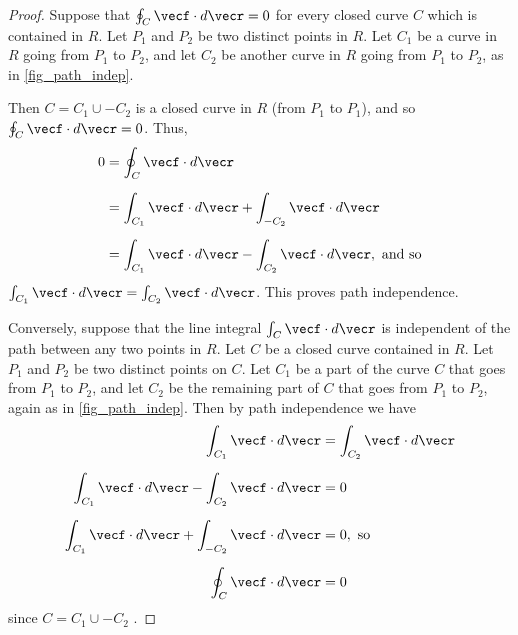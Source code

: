 
\begin{proof}
Suppose that
$\oint_{C}\vecf\cdot d\vecr = 0$ for every closed curve $C$  which is contained in $R$. Let $P_1$ and $P_2$ be two distinct points in $R$. Let $C_1$ be a curve in $R$ going from $P_1$ to $P_2$, and let $C_2$ be another curve in $R$ going from $P_1$ to $P_2$, as in \autoref{fig_path_indep}.

 
Then $C = C_1\cup -C_2$ is a closed curve in $R$ (from $P_1$ to $P_1$), and so $\oint_{C}\vecf\cdot d\vecr = 0$. Thus,
\begin{align*}
  0 &= \oint_{C}\vecf\cdot d\vecr\\[6pt]
  &= \int_{C_1}\vecf\cdot d\vecr + \int_{-C_2}\vecf\cdot d\vecr\\[6pt]
  &= \int_{C_1}\vecf\cdot d\vecr - \int_{C_2}\vecf\cdot d\vecr,\text{ and so}
\end{align*}
$\int_{C_1}\vecf\cdot d\vecr = \int_{C_2}\vecf\cdot d\vecr$. This proves path independence.

Conversely, suppose that the line integral $\int_{C}\vecf\cdot d\vecr$ is independent of the path between any two points in $R$. Let $C$ be a closed curve contained in $R$. Let $P_1$ and $P_2$ be two distinct points on $C$. Let $C_1$ be a part of the curve $C$ that goes from $P_1$ to $P_2$, and let $C_2$ be the remaining part of $C$ that goes from $P_1$ to $P_2$, again as in \autoref{fig_path_indep}. Then by path independence we have
 \begin{align*}
  \int_{C_1}\vecf\cdot d\vecr &= \int_{C_2}\vecf\cdot d\vecr\\[6pt]
  \int_{C_1}\vecf\cdot d\vecr - \int_{C_2}\vecf\cdot d\vecr &= 0\\[6pt]
  \int_{C_1}\vecf\cdot d\vecr + \int_{-C_2}\vecf\cdot d\vecr &= 0 ,\text{ so}\\[6pt]
  \oint_{C}\vecf\cdot d\vecr &= 0
 \end{align*}
 since $C = C_1\cup -C_2$ .
\end{proof}

